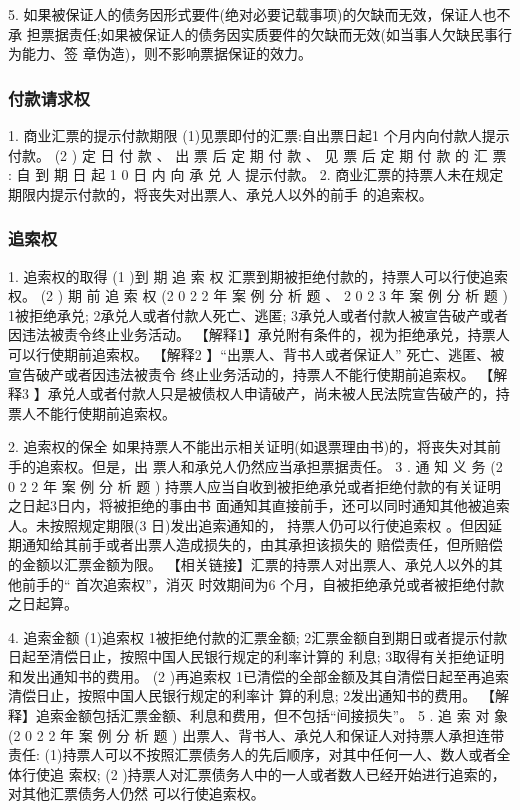 \documentclass[UTF8,12pt]{ctexart}
\numberwithin{equation}{section} %
\numberwithin{figure}{section}
\numberwithin{table}{section}
\begin{document}
	 5. 如果被保证人的债务因形式要件(绝对必要记载事项)的欠缺而无效，保证人也不承 担票据责任;如果被保证人的债务因实质要件的欠缺而无效(如当事人欠缺民事行为能力、签 章伪造)，则不影响票据保证的效力。
	 
	 
	
	\subsubsection{付款请求权} 
	1. 商业汇票的提示付款期限
	(1)见票即付的汇票:自出票日起1 个月内向付款人提示付款。
	(2 ) 定 日 付 款 、 出 票 后 定 期 付 款 、 见 票 后 定 期 付 款 的 汇 票 : 自 到 期 日 起 1 0 日 内 向 承 兑 人 提示付款。
	2. 商业汇票的持票人未在规定期限内提示付款的，将丧失对出票人、承兑人以外的前手 的追索权。
	
	\subsubsection{追索权}
	
	1. 追索权的取得
	(1 )到 期 追 索 权
	汇票到期被拒绝付款的，持票人可以行使追索权。
	(2 ) 期 前 追 索 权 (2 0 2 2 年 案 例 分 析 题 、 2 0 2 3 年 案 例 分 析 题 ) 1被拒绝承兑;
	2承兑人或者付款人死亡、逃匿; 3承兑人或者付款人被宣告破产或者因违法被责令终止业务活动。
	【解释1】承兑附有条件的，视为拒绝承兑，持票人可以行使期前追索权。
	【解释2 】“出票人、背书人或者保证人” 死亡、逃匿、被宣告破产或者因违法被责令 终止业务活动的，持票人不能行使期前追索权。
	【解释3 】承兑人或者付款人只是被债权人申请破产，尚未被人民法院宣告破产的，持 票人不能行使期前追索权。
	
	2. 追索权的保全 如果持票人不能出示相关证明(如退票理由书)的，将丧失对其前手的追索权。但是，出 票人和承兑人仍然应当承担票据责任。
	3 . 通 知 义 务 (2 0 2 2 年 案 例 分 析 题 ) 持票人应当自收到被拒绝承兑或者拒绝付款的有关证明之日起3日内，将被拒绝的事由书 面通知其直接前手，还可以同时通知其他被追索人。未按照规定期限(3 日)发出追索通知的， 持票人仍可以行使追索权 。但因延期通知给其前手或者出票人造成损失的，由其承担该损失的 赔偿责任，但所赔偿的金额以汇票金额为限。
	【相关链接】汇票的持票人对出票人、承兑人以外的其他前手的“ 首次追索权”，消灭 时效期间为6 个月，自被拒绝承兑或者被拒绝付款之日起算。
	
	4. 追索金额
	(1)追索权
	1被拒绝付款的汇票金额; 2汇票金额自到期日或者提示付款日起至清偿日止，按照中国人民银行规定的利率计算的 利息;
	3取得有关拒绝证明和发出通知书的费用。
	(2 )再追索权 1已清偿的全部金额及其自清偿日起至再追索清偿日止，按照中国人民银行规定的利率计 算的利息;
	2发出通知书的费用。 【解释】追索金额包括汇票金额、利息和费用，但不包括“间接损失”。
	5 . 追 索 对 象 (2 0 2 2 年 案 例 分 析 题 ) 出票人、背书人、承兑人和保证人对持票人承担连带责任: (1)持票人可以不按照汇票债务人的先后顺序，对其中任何一人、数人或者全体行使追 索权;
	(2 )持票人对汇票债务人中的一人或者数人已经开始进行追索的，对其他汇票债务人仍然 可以行使追索权。
	
\end{document}

